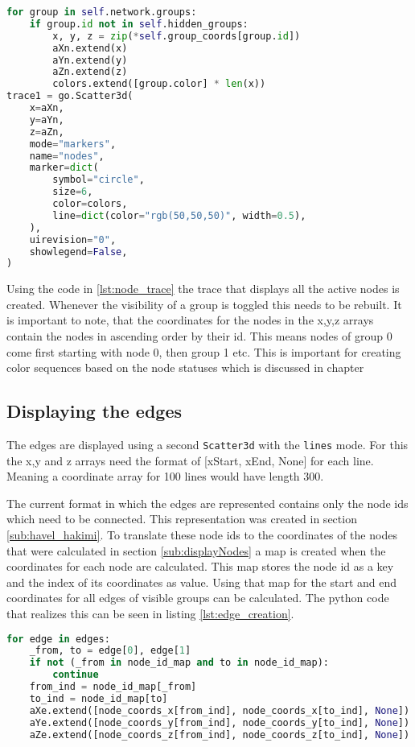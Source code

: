\begin{lstlisting}[language=python, caption={Creation of the node trace}, label={lst:node_trace}]
for group in self.network.groups:
    if group.id not in self.hidden_groups:
        x, y, z = zip(*self.group_coords[group.id])
        aXn.extend(x)
        aYn.extend(y)
        aZn.extend(z)
        colors.extend([group.color] * len(x))
trace1 = go.Scatter3d(
    x=aXn,
    y=aYn,
    z=aZn,
    mode="markers",
    name="nodes",
    marker=dict(
        symbol="circle",
        size=6,
        color=colors,
        line=dict(color="rgb(50,50,50)", width=0.5),
    ),
    uirevision="0",
    showlegend=False,
)
\end{lstlisting}

Using the code in \ref{lst:node_trace} the trace that displays all the active nodes is created. Whenever the visibility of a group is toggled this needs to be rebuilt. It is important to note, that the coordinates for the nodes in the x,y,z arrays contain the nodes in ascending order by their id. This means nodes of group 0 come first starting with node 0, then group 1 etc. This is important for creating color sequences based on the node statuses which is discussed in chapter %

\subsection{Displaying the edges}
The edges are displayed using a second \texttt{Scatter3d} with the \texttt{lines} mode. For this the x,y and z arrays need the format of [xStart, xEnd, None] for each line. Meaning a coordinate array for 100 lines would have length 300.

The current format in which the edges are represented contains only the node ids which need to be connected. This representation was created in section \ref{sub:havel_hakimi}. To translate these node ids to the coordinates of the nodes that were calculated in section \ref{sub:displayNodes} a map is created when the coordinates for each node are calculated. This map stores the node id as a key and the index of its coordinates as value. Using that map for the start and end coordinates for all edges of visible groups can be calculated. The python code that realizes this can be seen in listing \ref{lst:edge_creation}.
\begin{lstlisting}[language=python, caption={Creation of the edge coordinate arrays}, label={lst:edge_creation}]
 for edge in edges:
    _from, to = edge[0], edge[1]
    if not (_from in node_id_map and to in node_id_map):
        continue
    from_ind = node_id_map[_from]
    to_ind = node_id_map[to]
    aXe.extend([node_coords_x[from_ind], node_coords_x[to_ind], None])
    aYe.extend([node_coords_y[from_ind], node_coords_y[to_ind], None])
    aZe.extend([node_coords_z[from_ind], node_coords_z[to_ind], None])
\end{lstlisting}

